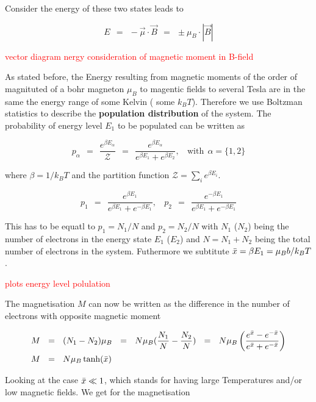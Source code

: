 \documentclass[10pt]{report}
\numberwithin{equation}{chapter}
\begin{document}
Consider the energy of these two states leads to

\begin{equation}
  E ~~=~~ - \vec{\mu} \cdot \vec{B} ~~=~~ \pm \mu_B \cdot |\vec{B}|
\end{equation}

\textcolor{red}{ vector diagram nergy consideration of magnetic moment in B-field}

As stated before, the Energy resulting from magnetic moments of the order of magnituted of a bohr magneton $\mu_B$ to magentic fields to several Tesla are in the same the energy range of some Kelvin ( some $k_B T$). Therefore we use Boltzman statistics to describe the \textbf{population distribution} of the system. The probability of energy level $E_1$ to be populated can be written as

\begin{equation}
  p_\alpha ~~=~~ \frac{e^{\beta E_\alpha}}{\mathcal{Z}} ~~=~~ \frac{e^{\beta E_\alpha}}{e^{\beta E_1} + e^{\beta E_2}}, ~~~~ \text{with} ~~ \alpha = \{1,2\}
\end{equation}


where $\beta = 1/k_BT$ and the partition function $\mathcal{Z} = \sum_i e^{\beta E_i}$. 


\begin{equation}
  p_1 ~~=~~ \frac{e^{ \beta E_1}}{e^{\beta E_1} + e^{-\beta E_1}}, ~~~~ 
  p_2 ~~=~~ \frac{e^{-\beta E_1}}{e^{\beta E_1} + e^{-\beta E_1}}
\end{equation}

This has to be equatl to $p_1 = N_1/N$ and $p_2 = N_2/N$ with $N_1$ ($N_2$) being the number of electrons in the energy state $E_1$ ($E_2$) and $N = N_1 + N_2$ being the total number of electrons in the system. Futhermore we subtitute $\Bar{x} = \beta E_1 = \mu_B b/k_B T$.

\textcolor{red}{plots energy level polulation}


The magnetisation $M$ can now be written as the difference in the number of electrons with opposite magnetic moment

\begin{align}
  M ~~& =~~ (N_1 - N_2) \mu_B ~~=~~ N \mu_B (\frac{N_1}{N} - \frac{N_2}{N}) ~~=~~ 
  N \mu_B \left( \frac{e^{\Bar{x}} - e^{-\Bar{x}}}{e^{\Bar{x}} + e^{-\Bar{x}}} \right) \nonumber \\
  M ~~& =~~ N \mu_B \tanh(\Bar{x})
\end{align}


Looking at the case $\Bar{x} \ll 1$, which stands for having large Temperatures and/or low magnetic fields. We get for the magnetisation
\end{document}
